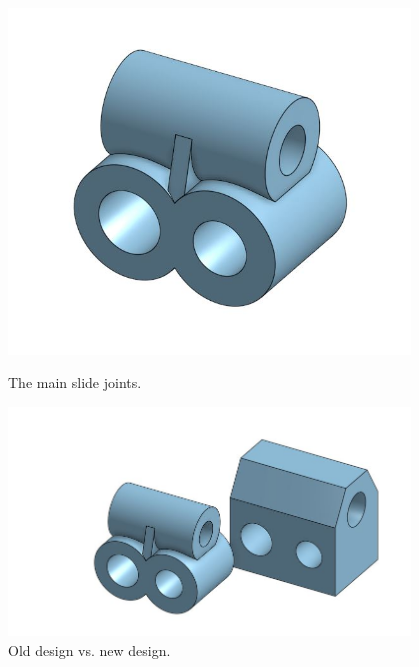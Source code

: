 \begin{figure}[ht]
\centering
\begin{minipage}[b]{.48\textwidth}
  \centering
  \includegraphics[width=0.95\textwidth]{Meetings/October/10-29-21/10-29-21_CAD_Figure1 - Nathan Forrer.JPG}
  \caption{The main slide joints.}
  \label{fig:102921_3}
\end{minipage}%
\hfill%
\begin{minipage}[b]{.48\textwidth}
  \centering
  \includegraphics[width=0.95\textwidth]{Meetings/October/10-29-21/10-29-21_CAD_Figure2 - Nathan Forrer.JPG}
  \caption{Old design vs. new design.}
  \label{fig:102921_4}
\end{minipage}
\end{figure}

